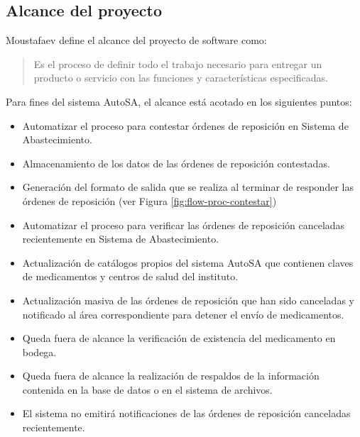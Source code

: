 \subsection{Alcance del proyecto}\label{sec-alcance}
Moustafaev define el alcance del proyecto de software como:
\begin{quote}
Es el proceso de definir todo el trabajo necesario para entregar un producto o servicio con las funciones y características especificadas\cite{ScopeManagement}.
\end{quote}
Para fines del sistema AutoSA, el alcance está acotado en los siguientes puntos:
\begin{itemize}
\item Automatizar el proceso para contestar órdenes de reposición en Sistema de Abastecimiento.
\item Almacenamiento de los datos de las órdenes de reposición contestadas.
\item Generación del formato de salida que se realiza al terminar de responder las órdenes de reposición (ver Figura \ref{fig:flow-proc-contestar})
\item Automatizar el proceso para verificar las órdenes de reposición canceladas recientemente en Sistema de Abastecimiento.
\item Actualización de catálogos propios del sistema AutoSA que contienen claves de medicamentos y centros de salud del instituto.
\item Actualización masiva de las órdenes de reposición que han sido canceladas y notificado al área correspondiente para detener el envío de medicamentos.
\item Queda fuera de alcance la verificación de existencia del medicamento en bodega.
\item Queda fuera de alcance la realización de respaldos de la información contenida en la base de datos o en el sistema de archivos.
\item El sistema no emitirá notificaciones de las órdenes de reposición canceladas recientemente.
\end{itemize}


